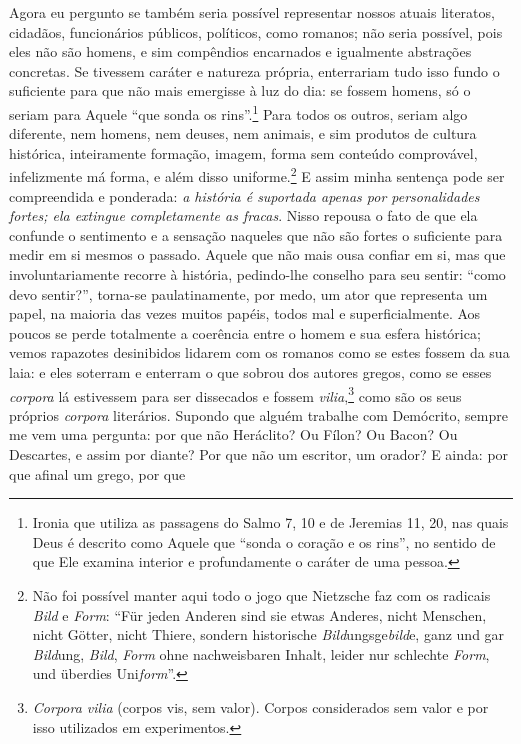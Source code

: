 Agora eu pergunto se
também seria possível representar nossos atuais literatos, cidadãos,
funcionários públicos, políticos, como romanos; não seria possível, pois
eles não são homens, e sim compêndios encarnados e igualmente abstrações
concretas. Se tivessem caráter e natureza própria, enterrariam tudo isso
fundo o suficiente para que não mais emergisse à luz do dia: se fossem
homens, só o seriam para Aquele ``que sonda os rins''.\footnote{Ironia
  que utiliza as passagens do Salmo 7, 10 e de Jeremias 11, 20, nas quais Deus
  é descrito como Aquele que ``sonda o coração e os rins'', no sentido
  de que Ele examina interior e profundamente o caráter de uma
  pessoa.} Para todos os outros, seriam algo diferente, nem homens, nem
deuses, nem animais, e sim produtos de cultura histórica, inteiramente
formação, imagem, forma sem conteúdo comprovável, infelizmente má forma,
e além disso uniforme.\footnote{Não foi possível manter aqui todo o jogo
  que Nietzsche faz com os radicais \emph{Bild} e \emph{Form}: ``Für
  jeden Anderen sind sie etwas Anderes, nicht Menschen, nicht Götter,
  nicht Thiere, sondern historische \emph{Bild}ungsge\emph{bild}e, ganz
  und gar \emph{Bild}ung, \emph{Bild}, \emph{Form} ohne nachweisbaren
  Inhalt, leider nur schlechte \emph{Form}, und überdies
  Uni\emph{form}''.} E assim minha sentença pode ser compreendida e
ponderada: \emph{a história é suportada apenas por personalidades
fortes; ela extingue completamente as fracas}. Nisso repousa o fato de
que ela confunde o sentimento e a sensação naqueles que não são fortes o
suficiente para medir em si mesmos o passado. Aquele que não mais ousa
confiar em si, mas que involuntariamente recorre à história, pedindo-lhe
conselho para seu sentir: ``como devo sentir?'', torna-se
paulatinamente, por medo, um ator que representa um papel, na maioria
das vezes muitos papéis, todos mal e superficialmente. Aos poucos se
perde totalmente a coerência entre o homem e sua esfera histórica; vemos
rapazotes desinibidos lidarem com os romanos como se estes fossem da sua
laia: e eles soterram e enterram o que sobrou dos autores gregos, como
se esses \emph{corpora} lá estivessem para ser dissecados e fossem
\emph{vilia},\footnote{\emph{Corpora vilia} (corpos vis, sem valor).
  Corpos considerados sem valor e por isso utilizados em experimentos.} 
como são os seus próprios \emph{corpora} literários. Supondo que alguém
trabalhe com Demócrito, sempre me vem uma pergunta: por que não
Heráclito? Ou Fílon? Ou Bacon? Ou Descartes, e assim por diante? Por que
não um escritor, um orador? E ainda: por que afinal um grego, por que
